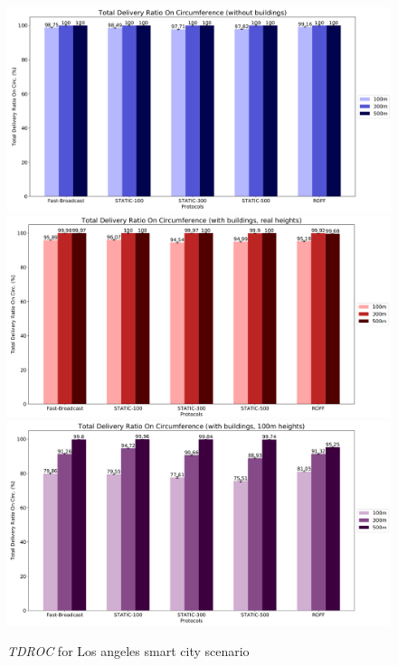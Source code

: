 	\begin{figure}[H]
		\centering
		\includegraphics[width=1.0\textwidth]{immagini/la-smart-city/b0/tdroc}
		\includegraphics[width=1.0\textwidth]{immagini/la-smart-city/b1/h0/tdroc}
		\includegraphics[width=1.0\textwidth]{immagini/la-smart-city/b1//h1/tdroc}
		\caption{\textit{TDROC} for Los angeles smart city scenario}
		\label{fig:la-smart-city-tdroc}
	\end{figure}
	
